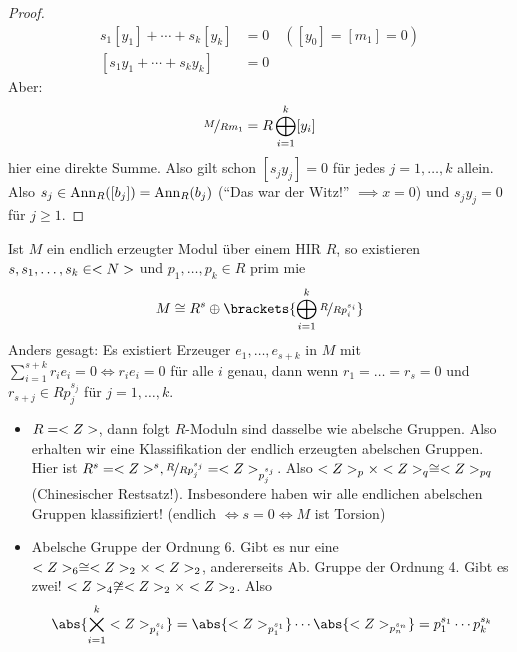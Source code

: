 \begin{proof}
	\begin{align*}
		s_1[y_1] + \cdots + s_k [y_k] &= 0 \quad ([y_0] = [m_1] = 0)\\
		[s_1 y_1 + \cdots + s_k y_k] &= 0
	\end{align*}
	Aber:
	\begin{align*}
		\lnkset{M}{R m_1} = R\bigoplus_{i=1}^k [y_i]
	\end{align*}
	hier eine direkte Summe. Also gilt schon $[s_j y_j] = 0$ für jedes $j = 1, \dots, k$ allein. Also $s_j \in \operatorname{Ann}_R([b_j]) = \operatorname{Ann}_R(b_j)$ (``Das war der Witz!'' $\implies x = 0$) und $s_j y_j = 0$ für $j \ge 1$.
\end{proof}
\begin{proposition}
	Ist $M$ ein endlich erzeugter Modul über einem HIR $R$, so existieren $s, s_1, \dots, s_k \in <N>$ und $p_1, \dots, p_k \in R$ prim mie 
	\begin{align*}
		M \cong R^s \oplus \brackets{\bigoplus_{i=1}^k \lnkset{R}{Rp_i^{s_i}}}
	\end{align*}
	Anders gesagt: Es existiert Erzeuger $e_1, \dots, e_{s+k}$ in $M$ mit $\sum_{i=1}^{s+k} r_i e_i = 0 \Leftrightarrow r_i e_i = 0$ für alle $i$ genau, dann wenn $r_1 = \dots = r_s = 0$ und $r_{s+j} \in Rp_j^{s_j}$ für $j = 1, \dots, k$. 
\end{proposition}
\begin{example}
	\begin{itemize}
		\item $R = <Z>$, dann folgt $R$-Moduln sind dasselbe wie abelsche Gruppen. Also erhalten wir eine Klassifikation der endlich erzeugten abelschen Gruppen. Hier ist $R^s = \Z^s, \lnkset{R}{Rp_j^{s_j}} = \Z_{p_j^{s_j}}$. Also $<Z>_p \times <Z>_q \cong <Z>_{pq}$ (Chinesischer Restsatz!). Insbesondere haben wir alle endlichen abelschen Gruppen klassifiziert! (endlich $\Leftrightarrow s = 0 \Leftrightarrow M$ ist Torsion)
		\item Abelsche Gruppe der Ordnung 6. Gibt es nur eine $<Z>_6 \cong <Z>_2 \times <Z>_2$, andererseits Ab. Gruppe der Ordnung 4. Gibt es zwei! $<Z>_4 \not\cong <Z>_2 \times <Z>_2$. Also
		\begin{align*}
			\abs{\bigtimes_{i=1}^k\Z_{p_i^{s_i}}} = \abs{\Z_{p_1^{s_1}}} \cdots \abs{\Z_{p_n^{s_n}}} = p_1^{s_1} \cdots p_k^{s_k}
		\end{align*}
	\end{itemize}
\end{example}